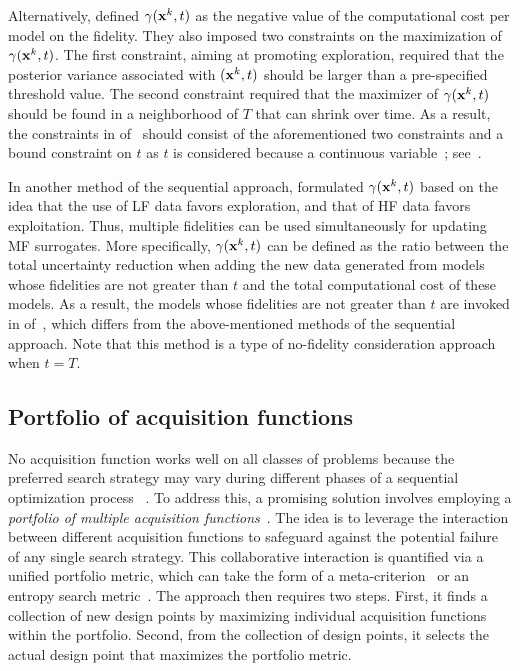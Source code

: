 \documentclass[iicol,sn-basic]{sn-jnl}%
\begin{document}
Alternatively, \cite{Kandasamy2017} defined $\gamma({\bf x}^k,t)$ as the negative value of the computational cost per model on the fidelity.
They also imposed two constraints on the maximization of $\gamma({\bf x}^k,t)$.
The first constraint, aiming at promoting exploration, required that the posterior variance associated with $({\bf x}^k,t)$ should be larger than a pre-specified threshold value.
The second constraint required that the maximizer of $\gamma({\bf x}^k,t)$ should be found in a neighborhood of $T$ that can shrink over time.
As a result, the constraints in  of~ should consist of the aforementioned two constraints and a bound constraint on $t$ as $t$ is considered because a continuous variable~\citep{Kandasamy2017}; see~.

In another method of the sequential approach, \cite{Meliani2019} formulated $\gamma({\bf x}^k,t)$ based on the idea that the use of LF data favors exploration, and that of HF data favors exploitation.
Thus, multiple fidelities can be used simultaneously for updating MF surrogates.
More specifically, $\gamma({\bf x}^k,t)$ can be defined as the ratio between the total uncertainty reduction when adding the new data generated from models whose fidelities are not greater than $t$ and the total computational cost of these models.
As a result, the models whose fidelities are not greater than $t$ are invoked in  of~, which differs from the above-mentioned methods of the sequential approach.
Note that this method is a type of no-fidelity consideration approach when $t=T$.

\subsection{Portfolio of acquisition functions}\label{Sec53}

No acquisition function works well on all classes of problems because the preferred search strategy may vary during different phases of a sequential optimization process ~\citep{Shahriari2016}.
To address this, a promising solution involves employing a \textit{portfolio of multiple acquisition functions}~\citep{Hoffman2014,Shahriari2014}.
The idea is to leverage the interaction between different acquisition functions to safeguard against the potential failure of any single search strategy.
This collaborative interaction is quantified via a unified portfolio metric, which can take the form of a meta-criterion~\citep{Hoffman2014} or an entropy search metric~\citep{Shahriari2014}.
The approach then requires two steps.
First, it finds a collection of new design points by maximizing individual acquisition functions within the portfolio.
Second, from the collection of design points, it selects the actual design point that maximizes the portfolio metric.
\end{document}

